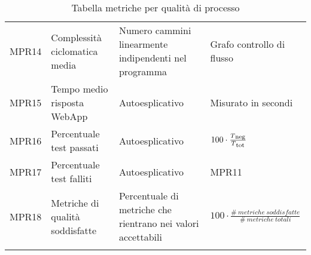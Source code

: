 {\begin{longtable}{C{.115\freewidth} C{.257\freewidth} C{.26\freewidth} C{.4\freewidth}}
    MPR14 & Complessità ciclomatica media & Numero cammini linearmente indipendenti nel programma & Grafo controllo di flusso \\
    MPR15 & Tempo medio risposta WebApp & Autoesplicativo & Misurato in secondi \\
    MPR16 & Percentuale test passati & Autoesplicativo & $100\cdot \frac{T\textsubscript{neg}}{ T\textsubscript{tot}}$ \\
    MPR17 & Percentuale test falliti & Autoesplicativo & MPR11 \\
    MPR18 & Metriche di qualità soddisfatte & Percentuale di metriche che rientrano nei valori accettabili & $100\cdot \frac{\# \: metriche \: soddisfatte}{\# \: metriche \: totali}$ \\	   
    \bottomrule
    \caption{Tabella metriche per qualità di processo}
    \end{longtable}
}
